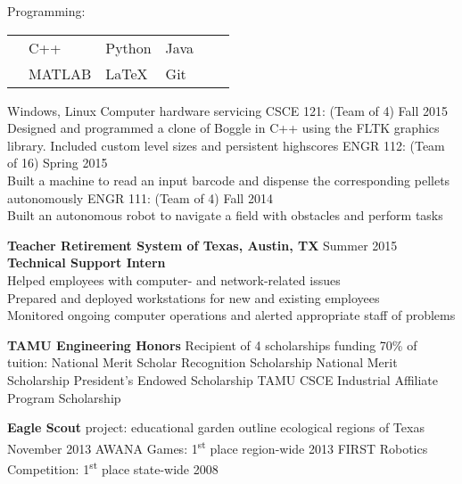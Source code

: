 \documentclass[12pt]{article}
\begin{document}
\begin{flushleft}
\begin{outline}
    \1 Programming: 
    \\
    \vspace{-\baselineskip}\vspace{-\upspacelength}
    \begin{tabularx}{\textwidth}{X X X X X X}
      & C++   & Python & Java\upspace \\
      & MATLAB& LaTeX & Git\upspace \\
    \end{tabularx}
    \vspace{-5px}\upspace
    \1 
    Windows, Linux
    \hfill{}\hspace{1px}
    Computer hardware servicing
    \hfill\hfill
    \1 CSCE 121:  (Team of 4) \hfill Fall 2015 
    \\ Designed and programmed a clone of Boggle in C++ using the FLTK graphics library. Included custom level sizes and persistent highscores
    \1 ENGR 112: (Team of 16) \hfill Spring 2015
    \\ Built a machine to read an input barcode and dispense the corresponding pellets autonomously 
    \1 ENGR 111: (Team of 4) \hfill Fall 2014
    \\ Built an autonomous robot to navigate a field with obstacles and perform tasks

    \1 \textbf{Teacher Retirement System of Texas, Austin, TX} \hfill Summer 2015
    \\ \textbf{Technical Support Intern}
    \\ Helped employees with computer- and network-related issues
    \\ Prepared and deployed workstations for new and existing employees
    \\ Monitored ongoing computer operations and alerted appropriate staff of problems

    \1 \textbf{TAMU Engineering Honors}
    \1 Recipient of 4 scholarships funding 70\% of tuition:
    \2 National Merit Scholar Recognition Scholarship
    \2 National Merit Scholarship
    \2 President's Endowed Scholarship
    \2 TAMU CSCE Industrial Affiliate Program Scholarship


    \1 \textbf{Eagle Scout} project: educational garden outline ecological regions of Texas \hfill November 2013
    \1 AWANA Games: 1\textsuperscript{st} place region-wide \hfill 2013
    \1 FIRST Robotics Competition: 1\textsuperscript{st} place state-wide \hfill 2008 \hfill

  \end{outline}
\end{flushleft}
\end{document}

